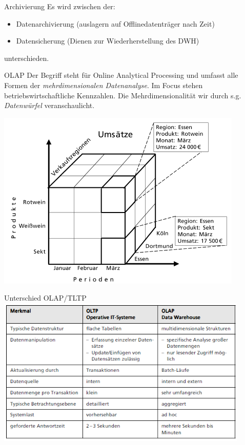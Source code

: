 \documentclass[a6paper,10pt,grid=front%
,toc
]{kartei}
\begin{document}
  \begin{karte}{Archivierung}  
    Es wird zwischen der:

    \begin{itemize}
      \item Datenarchivierung (auslagern auf Offlinedatenträger nach Zeit)
      \item Datensicherung (Dienen zur Wiederherstellung des DWH)
    \end{itemize}

    unterschieden.
  \end{karte}

  \begin{karte}{OLAP}  
    Der Begriff steht für Online Analytical Processing und umfasst alle Formen der \textit{mehrdimensionalen Datenanalyse}. Im Focus stehen betriebswirtschaftliche Kennzahlen. Die Mehrdimensionalität wir durch s.g. \textit{Datenwürfel} veranschaulicht.

    \includegraphics[height=0.65\paperheight]{img/wuerfel}
  \end{karte}

  \begin{karte}{Unterschied OLAP/TLTP}  
    \includegraphics[width=0.9\textwidth]{img/diff_olap_oltp}
  \end{karte}
\end{document}
